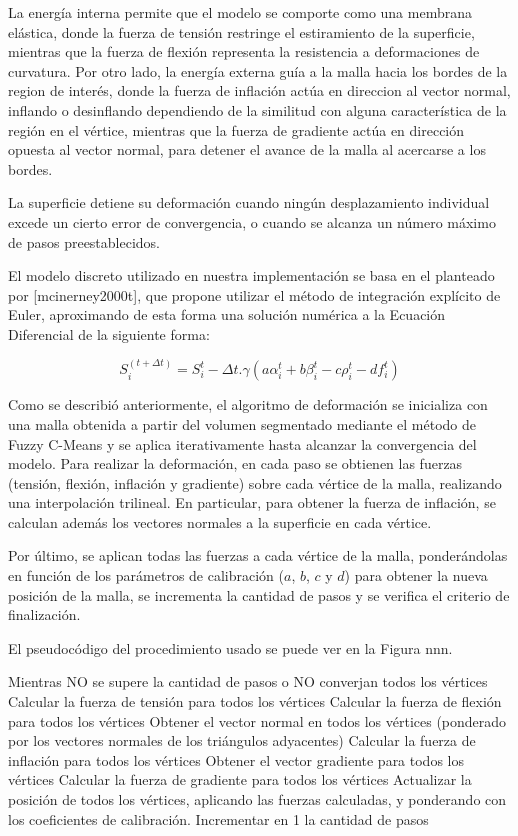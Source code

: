 La energía interna permite que el modelo se comporte como una membrana elástica, donde la fuerza de tensión restringe el estiramiento de la superficie, mientras que la fuerza de flexión representa la resistencia a deformaciones de curvatura. Por otro lado, la energía externa guía a la malla hacia los bordes de la region de interés, donde la fuerza de inflación actúa en direccion al vector normal, inflando o desinflando dependiendo de la similitud con alguna característica de la región en el vértice, mientras que la fuerza de gradiente actúa en dirección opuesta al vector normal, para detener el avance de la malla al acercarse a los bordes. 

La superficie detiene su deformación cuando ningún desplazamiento individual excede un cierto error de convergencia, o cuando se alcanza un número máximo de pasos preestablecidos.

El modelo discreto utilizado en nuestra implementación se basa en el planteado por \cite{} [mcinerney2000t], que propone utilizar el método de integración explícito de Euler, aproximando de esta forma una solución numérica a la Ecuación Diferencial de la siguiente forma:

$$ S^{(t+\Delta t)}_{i} = S_{i}^{t} - \Delta t.\gamma(a\alpha_{i}^{t} + b\beta_{i}^{t} - c\rho_{i}^{t} - df_{i}^{t}) $$

Como se describió anteriormente, el algoritmo de deformación se inicializa con una malla obtenida a partir del volumen segmentado mediante el método de Fuzzy C-Means y se aplica iterativamente hasta alcanzar la convergencia del modelo. Para realizar la deformación, en cada paso se obtienen las fuerzas (tensión, flexión, inflación y gradiente) sobre cada vértice de la malla, realizando una interpolación trilineal. En particular, para obtener la fuerza de inflación, se calculan además los vectores normales a la superficie en cada vértice. 

Por último, se aplican todas las fuerzas a cada vértice de la malla, ponderándolas en función de los parámetros de calibración ($a$, $b$, $c$ y $d$) para obtener la nueva posición de la malla, se incrementa la cantidad de pasos y se verifica el criterio de finalización.

El pseudocódigo del procedimiento usado se puede ver en la Figura nnn.

Mientras NO se supere la cantidad de pasos o NO converjan todos los vértices
Calcular la fuerza de tensión para todos los vértices
Calcular la fuerza de flexión para todos los vértices
Obtener el vector normal en todos los vértices (ponderado por los vectores normales de los triángulos adyacentes)
Calcular la fuerza de inflación para todos los vértices
Obtener el vector gradiente para todos los vértices
Calcular la fuerza de gradiente para todos los vértices
Actualizar la posición de todos los vértices, aplicando las fuerzas calculadas, y ponderando con los coeficientes de calibración.
Incrementar en 1 la cantidad de pasos


